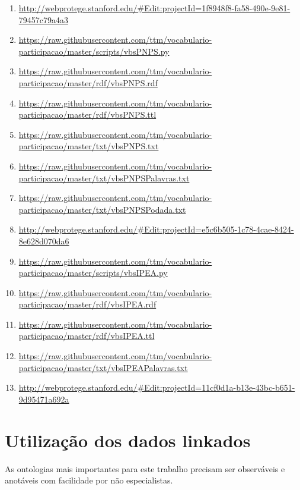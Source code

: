 \documentclass[12pt]{article}
\begin{document}
{\begin{enumerate}
    \item  \url{http://webprotege.stanford.edu/#Edit:projectId=1f8948f8-fa58-490e-9e81-79457c79a4a3}\label{i:76wp}

\item \url{https://raw.githubusercontent.com/ttm/vocabulario-participacao/master/scripts/vbsPNPS.py}         \label{i:77}
    \item \url{https://raw.githubusercontent.com/ttm/vocabulario-participacao/master/rdf/vbsPNPS.rdf}        \label{i:78}
    \item \url{https://raw.githubusercontent.com/ttm/vocabulario-participacao/master/rdf/vbsPNPS.ttl}        \label{i:79}
    \item \url{https://raw.githubusercontent.com/ttm/vocabulario-participacao/master/txt/vbsPNPS.txt}        \label{i:80}
    \item \url{https://raw.githubusercontent.com/ttm/vocabulario-participacao/master/txt/vbsPNPSPalavras.txt}\label{i:81}
    \item \url{https://raw.githubusercontent.com/ttm/vocabulario-participacao/master/txt/vbsPNPSPodada.txt}  \label{i:82}
    \item \url{http://webprotege.stanford.edu/#Edit:projectId=e5c6b505-1c78-4cae-8424-8e628d070da6}  \label{i:82wp}

\item \url{https://raw.githubusercontent.com/ttm/vocabulario-participacao/master/scripts/vbsIPEA.py}         \label{i:83}
    \item \url{https://raw.githubusercontent.com/ttm/vocabulario-participacao/master/rdf/vbsIPEA.rdf}        \label{i:84}
    \item \url{https://raw.githubusercontent.com/ttm/vocabulario-participacao/master/rdf/vbsIPEA.ttl}        \label{i:85}
    \item \url{https://raw.githubusercontent.com/ttm/vocabulario-participacao/master/txt/vbsIPEAPalavras.txt}\label{i:86}
    \item \url{http://webprotege.stanford.edu/#Edit:projectId=11cf0d1a-b13e-43bc-b651-9d95471a692a}\label{i:86wp}
\end{enumerate}
}

\section{Utilização dos dados linkados}\label{ap:ut}

As ontologias mais importantes para este trabalho precisam ser observáveis e anotáveis com facilidade por não especialistas.
\end{document}
